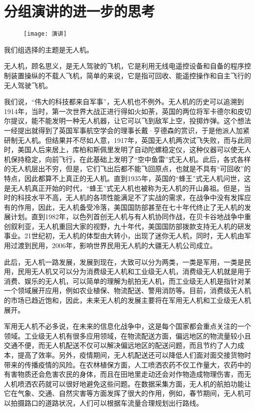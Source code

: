 \documentclass{article}
\begin{document}
\section{分组演讲的进一步的思考}
\begin{figure}[H]
\centering
\texttt{[image: 演讲]}
\label{fig:universe}
\end{figure}
我们组选择的主题是无人机。\par
无人机，顾名思义，是无人驾驶的飞机，它是利用无线电遥控设备和自备的程序控制装置操纵的不载人飞机，简单的来说，它是指可回收、能遥控操作和自主飞行的无人驾驶飞机。\par
我们说，“伟大的科技都来自军事”，无人机也不例外。无人机的历史可以追溯到1914年，当时，第一次世界大战正进行得如火如荼，英国的两位将军卡德尔和皮切尔提议，能不能发明一种无人机器，让它可以飞到敌军上空，投掷炸弹。这个想法一经提出就得到了英国军事航空学会的理事长戴·亨德森的赏识，于是他派人加紧研制无人机。但结果并不尽如人意，1917年，英国无人机两次试飞失败，而与此同时，美国人后来居上，库柏和斯佩里发明了自动陀螺稳定仪，这种仪器可以使无人机保持稳定，向前飞行，在此基础上发明了“空中鱼雷”式无人机。此后，各式各样的无人机层出不穷，但是，它们飞出后都不能飞回原点，也就是不具有“可回收”的特点，因此都算不上真正的无人机。直到1935年，英国的“蜂王”式无人机问世，这是无人机真正开始的时代，“蜂王”式无人机也被称为无人机的开山鼻祖。但是，当时的科技水平不高，无人机的各项性能满足不了实战的需求，在战争中没有发挥应有的作用，因此，无人机备受冷落，美国国防部甚至在七十年代终止了无人机的发展计划。直到1982年，以色列首创无人机与有人机协同作战，在贝卡谷地战争中重创叙利亚，无人机重回大家的视野，九十年代，美国国防部拨款支持无人机的研发事业。21世纪初，无人机的体型由大转小，出现了迷你无人机，同时，无人机由军用过渡到民用，2006年，影响世界民用无人机的大疆无人机公司成立。\par
此后，无人机一路发展，发展到现在，大致可以分为两类，一类是军用，一类是民用，民用无人机又可以分为消费级无人机和工业级无人机，消费级无人机就是用于消费、娱乐的无人机，可以简单的理解为航拍无人机，而工业级无人机是指针对某一个领域展开应用，例如农业植保、物流配送、警用消防等。目前，消费级无人机的市场已趋近饱和，因此，未来无人机的发展主要将在军用无人机和工业级无人机展开。\par
军用无人机不必多说，在未来的信息化战争中，这是每个国家都会重点关注的一个领域。工业级无人机有很多应用领域，在物流配送方面，偏远地区的物流量较小且交通不便，而无人机配送不仅可以解决偏远地区的配送问题，而且节约了人力成本，提高了效率。另外，疫情期间，无人机配送还可以降低人们面对面交接货物时带来的传播疫情的风险。在农林植保方面，人工喷洒农药不仅工作量大，农药中的有害物质还会危害农民的身体，而且在田地里走动还会对作物造成物理伤害，而无人机喷洒农药就可以很好地避免这些问题。在数据采集方面，无人机的航拍功能让它在气象、交通、自然灾害等方面发挥了很大的作用，例如，春节期间，无人机可以拍摄路口的道路状况，人们可以根据车流量合理规划出行路线。\par
\end{document}
